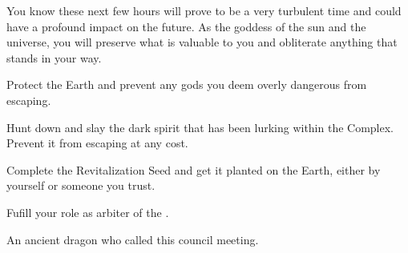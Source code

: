 \documentclass[char]{guardians}
\begin{document}
You know these next few hours will prove to be a very turbulent time and could have a profound impact on the future. As the goddess of the sun and the universe, you will preserve what is valuable to you and obliterate anything that stands in your way.

\begin{itemz}[Goals]
  \item Protect the Earth and prevent any gods you deem overly dangerous from escaping.
	\item Hunt down and slay the dark spirit that has been lurking within the Complex. Prevent it from escaping at any cost.
	\item Complete the Revitalization Seed and get it planted on the Earth, either by yourself or someone you trust.
	\item Fufill your role as arbiter of the \pGames{}.
\end{itemz}


\begin{contacts}
  \contact{\cCaretaker{}} An ancient dragon who called this council meeting.
\end{contacts}
\end{document}
